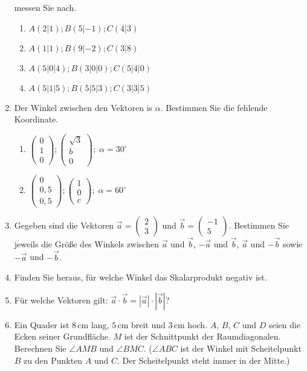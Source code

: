 \documentclass[12pt,a4paper,twoside,fleqn]{article}
\begin{document}
\begin{enumerate}
  messen Sie nach.
  \begin{multicols}{2}
    \begin{enumerate}
    \item $A(2|1); B(5|-1); C(4|3)$
    \item $A(1|1); B(9|-2); C(3|8)$
    \item $A(5|0|4); B(3|0|0); C(5|4|0)$
    \item $A(5|1|5); B(5|5|3); C(3|3|5)$
    \end{enumerate}
  \end{multicols}
\item Der Winkel zwischen den Vektoren is $\alpha$. Bestimmen Sie die
  fehlende Koordinate.
  \begin{multicols}{2}
    \begin{enumerate}
     \item  $\begin{pmatrix}
      0\\1\\0
    \end{pmatrix};
   \begin{pmatrix}
      \sqrt{3}\\b\\0
    \end{pmatrix}; \;
    \alpha = 30^\circ$ 
  \item  $\begin{pmatrix}
      0\\0,5\\0,5
    \end{pmatrix};
   \begin{pmatrix}
      1\\0\\c
    \end{pmatrix};\;
    \alpha = 60^\circ$
    \end{enumerate}
  \end{multicols}
\item Gegeben sind die Vektoren
  $\vec{a}=\begin{pmatrix} 2\\3 \end{pmatrix}$ und 
  $\vec{b}=\begin{pmatrix} -1\\5 \end{pmatrix}$. Bestimmen Sie jeweils
  die Größe des Winkels zwischen $\vec{a}$ und $\vec{b}$, $-\vec{a}$
  und $\vec{b}$, $\vec{a}$ und $-\vec{b}$ sowie $-\vec{a}$ und $-\vec{b}$.
\item Finden Sie heraus, für welche Winkel das Skalarprodukt negativ ist.
\item Für welche Vektoren gilt: $ \vec{a}\cdot\vec{b}=  |\vec{a}|\cdot|\vec{b}|$?
\item Ein Quader ist $8\,$cm lang, $5\,$cm breit und $3\,$cm
  hoch. $A$, $B$, $C$ und $D$ seien die Ecken seiner Grundfläche. $M$
  ist der Schnittpunkt der Raumdiagonalen. Berechnen Sie $\angle AMB$
  und $\angle BMC$. ($\angle ABC$ ist der Winkel mit Scheitelpunkt $B$
  zu den Punkten $A$ und $C$. Der Scheitelpunkt steht immer in der Mitte.)
\end{enumerate}
\end{document}
